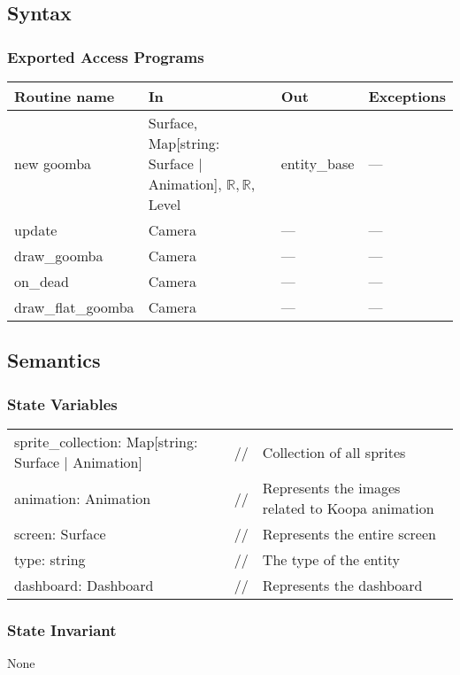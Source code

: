 \documentclass[12pt]{article}
\begin{document}
\subsection* {Syntax}

\subsubsection* {Exported Access Programs}

\begin{tabular}{| l | l | l | l |}
\hline
\textbf{Routine name} & \textbf{In} & \textbf{Out} & \textbf{Exceptions}\\
\hline
new goomba & Surface, Map[string: Surface $|$ Animation], $\mathbb{R, R}$, Level & entity\_base & ---\\
\hline
update & Camera & --- & ---\\
\hline
draw\_goomba & Camera & --- & ---\\
\hline
on\_dead & Camera & --- & ---\\
\hline
draw\_flat\_goomba & Camera & --- & ---\\
\hline
\end{tabular}

\subsection* {Semantics}

\subsubsection* {State Variables}
\begin{tabular}{lll}
sprite\_collection: Map[string: Surface | Animation] & // & Collection of all sprites\\
animation: Animation & // & Represents the images related to Koopa animation\\
screen: Surface & // & Represents the entire screen\\
type: string & // & The type of the entity\\
dashboard: Dashboard & // & Represents the dashboard\\
\end{tabular}

\subsubsection* {State Invariant}

None
\end{document}
